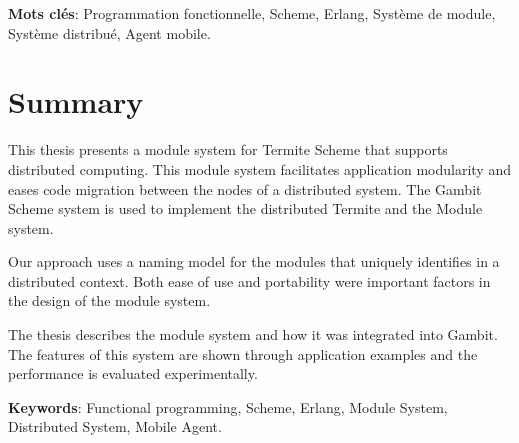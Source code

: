 \documentclass[12pt,maitrise]{dms}
\theoremstyle{definition}
\numberwithin{equation}{section}
\numberwithin{table}{chapter}
\numberwithin{figure}{chapter}
\begin{document}
\vspace*{1.5ex}
\noindent\textbf{Mots clés}: Programmation fonctionnelle,
Scheme, Erlang, Système de module, Système distribué, Agent mobile.


\anglais{}
\chapter*{Summary}

This thesis presents a module system for Termite Scheme that supports
distributed computing.  This module system facilitates application modularity
and eases code migration between the nodes of a distributed system. The Gambit
Scheme system is used to implement the distributed Termite and the Module
system.

Our approach uses a naming model for the modules
that uniquely identifies in a distributed
context. Both ease of use and portability were important factors
in the design of the module system.

The thesis describes the module system and how it was integrated into Gambit.
The features of this system are shown through application examples and the
performance is evaluated experimentally.

\vspace*{1.5ex}
\noindent\textbf{Keywords}: Functional programming, Scheme, Erlang,
Module System, Distributed System, Mobile Agent.


\francais
\cleardoublepage
{}  %
\tableofcontents
\cleardoublepage%
\cleardoublepage%
%
\listoffigures
\end{document}
